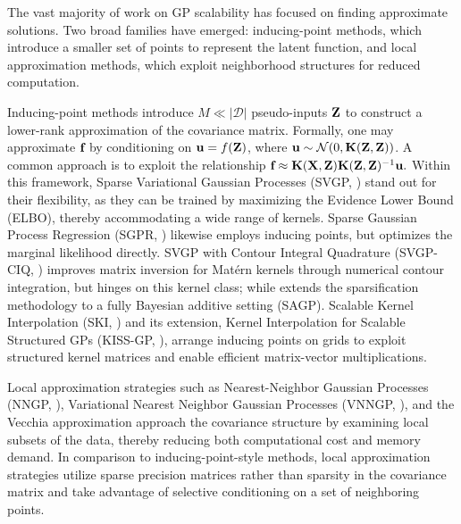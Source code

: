 \documentclass{article}
\renewcommand{\mathbf}[1]{%
  \ifx#1x x\else \textbf{#1}\fi
}
\begin{document}
The vast majority of work on GP scalability has focused on finding approximate solutions. Two broad families have emerged: inducing-point methods, which introduce a smaller set of points to represent the latent function, and local approximation methods, which exploit neighborhood structures for reduced computation. 

Inducing-point methods introduce $M \ll |\mathcal{D}|$ pseudo-inputs $\mathbf{Z}$ to construct a lower-rank approximation of the covariance matrix. Formally, one may approximate $\mathbf{f}$ by conditioning on $\mathbf{u} = f(\mathbf{Z})$, where $\mathbf{u} \sim \mathcal{N}(0, \mathbf{K}(\mathbf{Z}, \mathbf{Z}))$. A common approach is to exploit the relationship $\mathbf{f} \approx \mathbf{K}(\mathbf{X}, \mathbf{Z}) \mathbf{K}(\mathbf{Z}, \mathbf{Z})^{-1} \mathbf{u}.$ Within this framework, Sparse Variational Gaussian Processes (SVGP, \citep{hensman2013gaussian}) stand out for their flexibility, as they can be trained by maximizing the Evidence Lower Bound (ELBO), thereby accommodating a wide range of kernels. Sparse Gaussian Process Regression (SGPR, \citep{snelson2005sparse}) likewise employs inducing points, but optimizes the marginal likelihood directly. SVGP with Contour Integral Quadrature (SVGP-CIQ, \citep{pleiss2020scalable}) improves matrix inversion for Matérn kernels through numerical contour integration, but hinges on this kernel class; while \citep{luo2022sparse} extends the sparsification methodology to a fully Bayesian additive setting (SAGP). Scalable Kernel Interpolation (SKI, \citep{wilson2015kernel,wilson2015thoughts}) and its extension, Kernel Interpolation for Scalable Structured GPs (KISS-GP, \citep{wilson2015kernel}), arrange inducing points on grids to exploit structured kernel matrices and enable efficient matrix-vector multiplications. 

Local approximation strategies such as Nearest-Neighbor Gaussian Processes (NNGP, \citep{datta2016hierarchical}), Variational Nearest Neighbor Gaussian Processes (VNNGP, \citep{wu2022variational}), and the Vecchia approximation \citep{vecchia1988estimation, Katzfuss2021} approach the covariance structure by examining local subsets of the data, thereby reducing both computational cost and memory demand. In comparison to inducing-point-style methods, local approximation strategies utilize sparse precision matrices rather than sparsity in the covariance matrix and take advantage of selective conditioning on a set of neighboring points.
\end{document}
